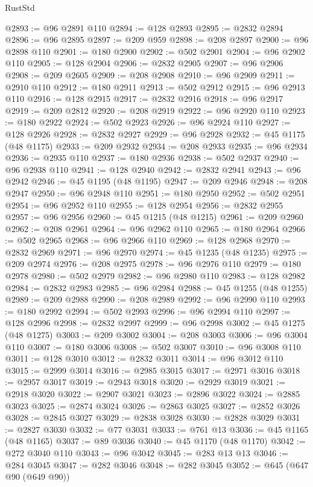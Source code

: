 \begin{lexlean}{RustStd}
\begin{coremodule}
{\begin{coremodule}
{{{{{{{{{{{{{{{{{{{{{{{{{{{{{{{{{{{{{{{{{{{{{{{{{{{{{{{{{{{{@2893 := @96 @2891 @110
@2894 := @128 @2893
@2895 := @2832 @2894
@2896 := @96 @2895
@2897 := @209 @959
@2898 := @208 @2897
@2900 := @96 @2898 @110
@2901 := @180 @2900
@2902 := @502 @2901
@2904 := @96 @2902 @110
@2905 := @128 @2904
@2906 := @2832 @2905
@2907 := @96 @2906
@2908 := @209 @2605
@2909 := @208 @2908
@2910 := @96 @2909
@2911 := @2910 @110
@2912 := @180 @2911
@2913 := @502 @2912
@2915 := @96 @2913 @110
@2916 := @128 @2915
@2917 := @2832 @2916
@2918 := @96 @2917
@2919 := @209 @2812
@2920 := @208 @2919
@2922 := @96 @2920 @110
@2923 := @180 @2922
@2924 := @502 @2923
@2926 := @96 @2924 @110
@2927 := @128 @2926
@2928 := @2832 @2927
@2929 := @96 @2928
@2932 := @45 @1175 (@48 @1175)
@2933 := @209 @2932
@2934 := @208 @2933
@2935 := @96 @2934
@2936 := @2935 @110
@2937 := @180 @2936
@2938 := @502 @2937
@2940 := @96 @2938 @110
@2941 := @128 @2940
@2942 := @2832 @2941
@2943 := @96 @2942
@2946 := @45 @1195 (@48 @1195)
@2947 := @209 @2946
@2948 := @208 @2947
@2950 := @96 @2948 @110
@2951 := @180 @2950
@2952 := @502 @2951
@2954 := @96 @2952 @110
@2955 := @128 @2954
@2956 := @2832 @2955
@2957 := @96 @2956
@2960 := @45 @1215 (@48 @1215)
@2961 := @209 @2960
@2962 := @208 @2961
@2964 := @96 @2962 @110
@2965 := @180 @2964
@2966 := @502 @2965
@2968 := @96 @2966 @110
@2969 := @128 @2968
@2970 := @2832 @2969
@2971 := @96 @2970
@2974 := @45 @1235 (@48 @1235)
@2975 := @209 @2974
@2976 := @208 @2975
@2978 := @96 @2976 @110
@2979 := @180 @2978
@2980 := @502 @2979
@2982 := @96 @2980 @110
@2983 := @128 @2982
@2984 := @2832 @2983
@2985 := @96 @2984
@2988 := @45 @1255 (@48 @1255)
@2989 := @209 @2988
@2990 := @208 @2989
@2992 := @96 @2990 @110
@2993 := @180 @2992
@2994 := @502 @2993
@2996 := @96 @2994 @110
@2997 := @128 @2996
@2998 := @2832 @2997
@2999 := @96 @2998
@3002 := @45 @1275 (@48 @1275)
@3003 := @209 @3002
@3004 := @208 @3003
@3006 := @96 @3004 @110
@3007 := @180 @3006
@3008 := @502 @3007
@3010 := @96 @3008 @110
@3011 := @128 @3010
@3012 := @2832 @3011
@3014 := @96 @3012 @110
@3015 := @2999 @3014
@3016 := @2985 @3015
@3017 := @2971 @3016
@3018 := @2957 @3017
@3019 := @2943 @3018
@3020 := @2929 @3019
@3021 := @2918 @3020
@3022 := @2907 @3021
@3023 := @2896 @3022
@3024 := @2885 @3023
@3025 := @2874 @3024
@3026 := @2863 @3025
@3027 := @2852 @3026
@3028 := @2845 @3027
@3029 := @2838 @3028
@3030 := @2828 @3029
@3031 := @2827 @3030
@3032 := @77 @3031
@3033 := @761 @13
@3036 := @45 @1165 (@48 @1165)
@3037 := @89 @3036
@3040 := @45 @1170 (@48 @1170)
@3042 := @272 @3040 @110
@3043 := @96 @3042
@3045 := @283 @13 @13
@3046 := @284 @3045
@3047 := @282 @3046
@3048 := @282 @3045
@3052 := @645 (@647 @90 (@649 @90))
}}}}}}}}}}}}}}}}}}}}}}}}}}}}}}}}}}}}}}}}}}}}}}}}}}}}}}}}}}}}
\end{coremodule}}
\end{coremodule}
\end{lexlean}
